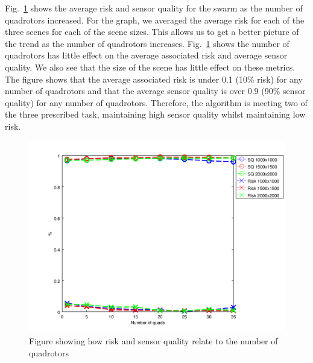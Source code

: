 \documentclass{article}
\begin{document}
Fig.~\ref{fig:nqs_r_sq} shows the average risk and sensor quality for the swarm
as the number of quadrotors increased. For the graph, we averaged the average
risk for each of the three scenes for each of the scene sizes. This allows us
to get a better picture of the trend as the number of quadrotors increases.
Fig.~\ref{fig:nqs_r_sq} shows the number of quadrotors has little effect on the
average associated risk and average sensor quality. We also see that the size
of the scene has little effect on these metrics. The figure shows that the
average associated risk is under 0.1 (10\% risk) for any number of quadrotors
and that the average sensor quality is over 0.9 (90\% sensor quality) for any
number of quadrotors. Therefore, the algorithm is meeting two of the three
prescribed task, maintaining high sensor quality whilst maintaining low risk.

\begin{figure}[h!]

    \includegraphics[width=1\columnwidth]{tasefigs/perf_quads_sq_risk.png}

    \caption{Figure showing how risk and sensor quality relate to the number of
    quadrotors}

    \label{fig:nqs_r_sq}

\end{figure}
\end{document}
